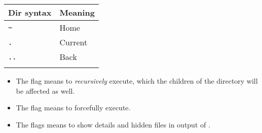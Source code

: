 \documentclass{article}
\begin{document}
\begin{minipage}{0.2\textwidth}
    \begin{table}[H]
        \begin{tabular}{ll}
            \textbf{Dir syntax} & \textbf{Meaning} \\ \hline
            \lstinline|~|       & Home             \\ \arrayrulecolor{lightgray}\hline
            \lstinline|.|       & Current          \\ \arrayrulecolor{lightgray}\hline
            \lstinline|..|      & Back             \\ \arrayrulecolor{lightgray}\hline
        \end{tabular}
    \end{table}

\end{minipage}
\begin{itemize}
    \item The flag  means to \emph{recursively} execute, which the children of the directory will be affected as well.
    \item The flag  means to forcefully execute.
    \item The flags  means to show details and hidden files in output of .
\end{itemize}
\end{document}
